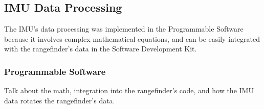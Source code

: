 \subsection{IMU Data Processing}
The IMU's data processing was implemented in the Programmable Software because it involves complex mathematical equations, and can be easily integrated with the rangefinder's data in the Software Development Kit.

\subsubsection{Programmable Software}
Talk about the math, integration into the rangefinder's code, and how the IMU data rotates the rangefinder's data.